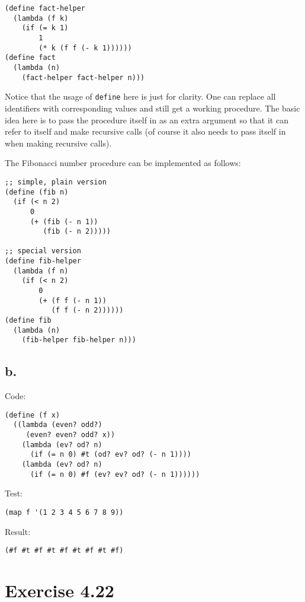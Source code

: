 \documentclass[../main.tex]{subfiles}
\begin{document}
\begin{lstlisting}
(define fact-helper
  (lambda (f k)
    (if (= k 1)
        1
        (* k (f f (- k 1))))))
(define fact
  (lambda (n)
    (fact-helper fact-helper n)))
\end{lstlisting}

Notice that the usage of \lstinline{define} here is just for clarity. One can replace all identifiers with corresponding values and still get a working procedure. The basic idea here is to pass the procedure itself in as an extra argument so that it can refer to itself and make recursive calls (of course it also needs to pass itself in when making recursive calls).

The Fibonacci number procedure can be implemented as follows:

\begin{lstlisting}
;; simple, plain version
(define (fib n)
  (if (< n 2)
      0
      (+ (fib (- n 1))
         (fib (- n 2)))))

;; special version
(define fib-helper
  (lambda (f n)
    (if (< n 2)
        0
        (+ (f f (- n 1))
           (f f (- n 2))))))
(define fib
  (lambda (n)
    (fib-helper fib-helper n)))
\end{lstlisting}

\subsection{b.}

Code:

\begin{lstlisting}
(define (f x)
  ((lambda (even? odd?)
     (even? even? odd? x))
    (lambda (ev? od? n)
      (if (= n 0) #t (od? ev? od? (- n 1))))
    (lambda (ev? od? n)
      (if (= n 0) #f (ev? ev? od? (- n 1))))))
\end{lstlisting}

Test:

\begin{lstlisting}
(map f '(1 2 3 4 5 6 7 8 9))
\end{lstlisting}

Result:

\begin{lstlisting}
(#f #t #f #t #f #t #f #t #f)
\end{lstlisting}

\section{Exercise 4.22}
\end{document}
